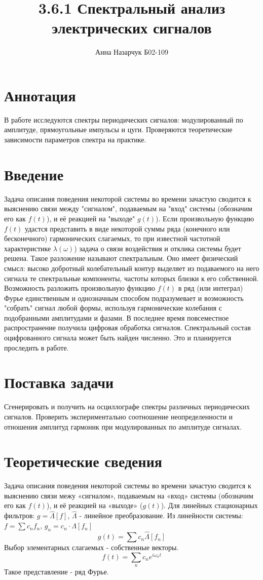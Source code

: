\documentclass[a4paper,12pt]{article} %
\author{Анна Назарчук Б02-109}
\title{3.6.1 Спектральный анализ электрических сигналов}
\date{}
\begin{document}
\maketitle
\section{Аннотация}
В работе исследуются спектры периодических сигналов: модулированный по амплитуде, прямоугольные импульсы и цуги. Проверяются теоретические зависимости параметров спектра на практике.


\section{Введение}
Задача описания поведения некоторой системы во времени зачастую
сводится к выяснению связи между "сигналом", подаваемым на "вход"
системы (обозначим его как $f(t)$), и её реакцией на "выходе" $g(t)$). Если произвольную функцию $f(t)$ удастся представить в виде
некоторой суммы ряда (конечного или бесконечного) гармонических
слагаемых, то при известной частотной характеристике $\lambda(\omega)$) задача
о связи воздействия и отклика системы будет решена. Такое разложение
называют спектральным. Оно имеет физический смысл: высоко добротный колебательный контур выделяет из подаваемого на него сигнала те спектральные компоненты, частоты которых близки к его собственной. Возможность разложить произвольную функцию $f(t)$ в ряд (или интеграл)
Фурье единственным и однозначным способом подразумевает и
возможность "собрать" сигнал любой формы, используя гармонические
колебания с подобранными амплитудами и фазами. В последнее время повсеместное распространение получила цифровая
обработка сигналов. Спектральный состав оцифрованного сигнала
может быть найден численно. Это и планируется проследить в работе.


\section{Поставка задачи}
Сгенерировать и получить на осциллографе спектры различных периодических сигналов. Проверить экспериментально соотношение неопределенности и отношения амплитуд гармоник при модулированных по амплитуде сигналах.

\section{Теоретические сведения}
Задача описания поведения некоторой системы во времени зачастую
сводится к выяснению связи межу «сигналом», подаваемым на «вход»
системы (обозначим его как $f(t)$), и её реакцией на «выходе» ($g(t)$). 
Для линейных стационарных фильтров: $g = \hat{\Lambda}[f]$, $\hat{\Lambda}$ - линейное преобразование. Из линейности системы: $f=\sum c_nf_n$, $g_n = c_n \cdot \hat{\Lambda}[f_n]$
\begin{equation}
g(t) = \sum c_n \hat{\Lambda}[f_n]
\end{equation}
Выбор элементарных слагаемых - собственные векторы.
\begin{equation}
f(t) = \sum_n c_n e^{i\omega_n t}
\end{equation}
Такое представление - ряд Фурье. 
\end{document}
